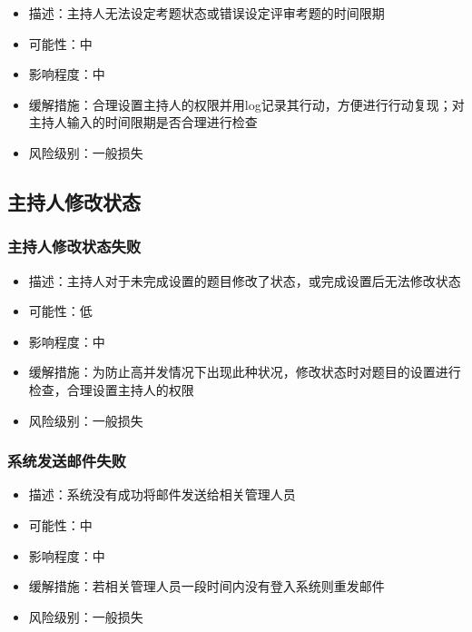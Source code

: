 \documentclass[hyperref, a4paper]{ctexart}
\providecommand{\tightlist}{%
  \setlength{\itemsep}{0pt}\setlength{\parskip}{0pt}}
\begin{document}
\begin{itemize}
\tightlist
\item
  描述：主持人无法设定考题状态或错误设定评审考题的时间限期
\item
  可能性：中
\item
  影响程度：中
\item
  缓解措施：合理设置主持人的权限并用log记录其行动，方便进行行动复现；对主持人输入的时间限期是否合理进行检查
\item
  风险级别：一般损失
\end{itemize}

\hypertarget{ux4e3bux6301ux4ebaux4feeux6539ux72b6ux6001}{%
\subsection{主持人修改状态}\label{ux4e3bux6301ux4ebaux4feeux6539ux72b6ux6001}}

\hypertarget{ux4e3bux6301ux4ebaux4feeux6539ux72b6ux6001ux5931ux8d25}{%
\subsubsection{主持人修改状态失败}\label{ux4e3bux6301ux4ebaux4feeux6539ux72b6ux6001ux5931ux8d25}}

\begin{itemize}
\tightlist
\item
  描述：主持人对于未完成设置的题目修改了状态，或完成设置后无法修改状态
\item
  可能性：低
\item
  影响程度：中
\item
  缓解措施：为防止高并发情况下出现此种状况，修改状态时对题目的设置进行检查，合理设置主持人的权限
\item
  风险级别：一般损失
\end{itemize}

\hypertarget{ux7cfbux7edfux53d1ux9001ux90aeux4ef6ux5931ux8d25-1}{%
\subsubsection{系统发送邮件失败}\label{ux7cfbux7edfux53d1ux9001ux90aeux4ef6ux5931ux8d25-1}}

\begin{itemize}
\tightlist
\item
  描述：系统没有成功将邮件发送给相关管理人员
\item
  可能性：中
\item
  影响程度：中
\item
  缓解措施：若相关管理人员一段时间内没有登入系统则重发邮件
\item
  风险级别：一般损失
\end{itemize}
\end{document}
